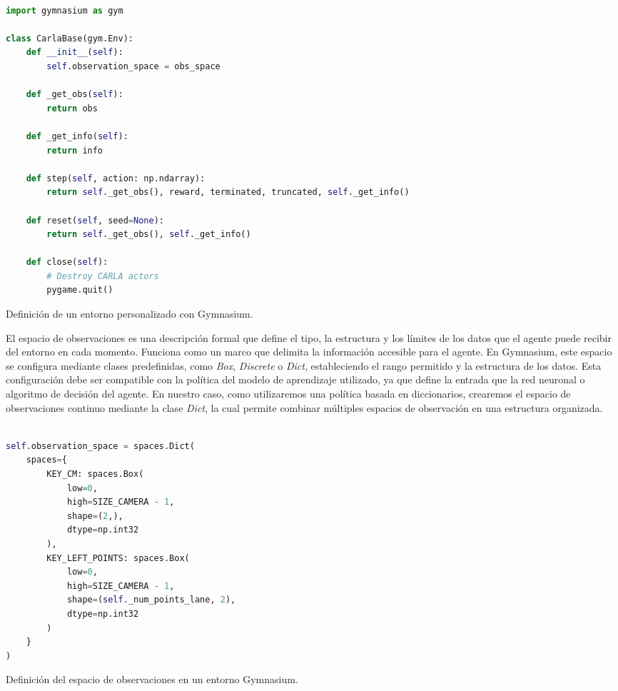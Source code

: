\begin{code}[H]
\begin{lstlisting}[language=Python]

import gymnasium as gym

class CarlaBase(gym.Env):
    def __init__(self):
        self.observation_space = obs_space
    
    def _get_obs(self):
        return obs
    
    def _get_info(self):
        return info
    
    def step(self, action: np.ndarray):
        return self._get_obs(), reward, terminated, truncated, self._get_info()
   
    def reset(self, seed=None):
        return self._get_obs(), self._get_info()
    
    def close(self):
        # Destroy CARLA actors
        pygame.quit()

\end{lstlisting}
\caption[Definición de un entorno personalizado en Gymnasium]{Definición de un entorno personalizado con Gymnasium.}
\label{cod:gym}
\end{code}

El espacio de observaciones es una descripción formal que define el tipo, la estructura y los límites de los datos que el agente puede recibir del entorno en cada momento. Funciona como un marco que delimita la información accesible para el agente. En Gymnasium, este espacio se configura mediante clases predefinidas, como \textit{Box}, \textit{Discrete} o \textit{Dict}, estableciendo el rango permitido y la estructura de los datos. Esta configuración debe ser compatible con la política del modelo de aprendizaje utilizado, ya que define la entrada que la red neuronal o algoritmo de decisión del agente. En nuestro caso, como utilizaremos una política basada en diccionarios, crearemos el espacio de observaciones continuo mediante la clase \textit{Dict}, la cual permite combinar múltiples espacios de observación en una estructura organizada.

\begin{code}[H]
\begin{lstlisting}[language=Python]

self.observation_space = spaces.Dict(
	spaces={
		KEY_CM: spaces.Box(
			low=0,
			high=SIZE_CAMERA - 1,
			shape=(2,),
			dtype=np.int32
		),
		KEY_LEFT_POINTS: spaces.Box(
			low=0,
			high=SIZE_CAMERA - 1,
			shape=(self._num_points_lane, 2),
			dtype=np.int32
		)
	}
)

\end{lstlisting}
\caption[Definición del espacio de observaciones en un entorno Gymnasium]{Definición del espacio de observaciones en un entorno Gymnasium.}
\label{cod:gymobs}
\end{code}

